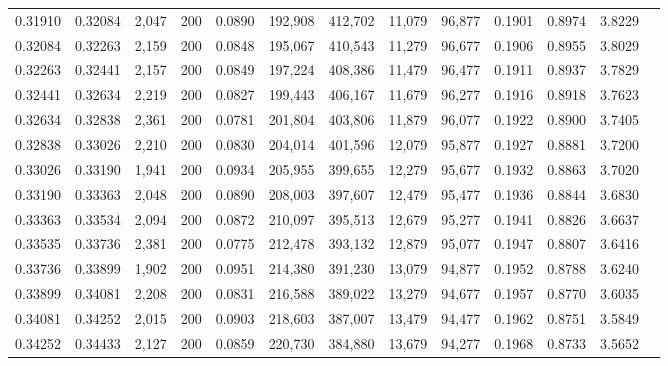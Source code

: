 \begin{tabular}{rrrrrrrrrrrrr}
0.31910 & 0.32084 & 2,047 & 200 &                                     0.0890 & 192,908 & 412,702 &  11,079 &  96,877 & 0.1901 & 0.8974 & 3.8229 \\
0.32084 & 0.32263 & 2,159 & 200 &                                     0.0848 & 195,067 & 410,543 &  11,279 &  96,677 & 0.1906 & 0.8955 & 3.8029 \\
0.32263 & 0.32441 & 2,157 & 200 &                                     0.0849 & 197,224 & 408,386 &  11,479 &  96,477 & 0.1911 & 0.8937 & 3.7829 \\
0.32441 & 0.32634 & 2,219 & 200 &                                     0.0827 & 199,443 & 406,167 &  11,679 &  96,277 & 0.1916 & 0.8918 & 3.7623 \\
0.32634 & 0.32838 & 2,361 & 200 &                                     0.0781 & 201,804 & 403,806 &  11,879 &  96,077 & 0.1922 & 0.8900 & 3.7405 \\
0.32838 & 0.33026 & 2,210 & 200 &                                     0.0830 & 204,014 & 401,596 &  12,079 &  95,877 & 0.1927 & 0.8881 & 3.7200 \\
0.33026 & 0.33190 & 1,941 & 200 &                                     0.0934 & 205,955 & 399,655 &  12,279 &  95,677 & 0.1932 & 0.8863 & 3.7020 \\
0.33190 & 0.33363 & 2,048 & 200 &                                     0.0890 & 208,003 & 397,607 &  12,479 &  95,477 & 0.1936 & 0.8844 & 3.6830 \\
0.33363 & 0.33534 & 2,094 & 200 &                                     0.0872 & 210,097 & 395,513 &  12,679 &  95,277 & 0.1941 & 0.8826 & 3.6637 \\
0.33535 & 0.33736 & 2,381 & 200 &                                     0.0775 & 212,478 & 393,132 &  12,879 &  95,077 & 0.1947 & 0.8807 & 3.6416 \\
0.33736 & 0.33899 & 1,902 & 200 &                                     0.0951 & 214,380 & 391,230 &  13,079 &  94,877 & 0.1952 & 0.8788 & 3.6240 \\
0.33899 & 0.34081 & 2,208 & 200 &                                     0.0831 & 216,588 & 389,022 &  13,279 &  94,677 & 0.1957 & 0.8770 & 3.6035 \\
0.34081 & 0.34252 & 2,015 & 200 &                                     0.0903 & 218,603 & 387,007 &  13,479 &  94,477 & 0.1962 & 0.8751 & 3.5849 \\
0.34252 & 0.34433 & 2,127 & 200 &                                     0.0859 & 220,730 & 384,880 &  13,679 &  94,277 & 0.1968 & 0.8733 & 3.5652 \\

\end{tabular}
